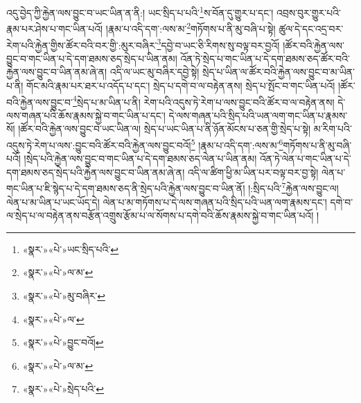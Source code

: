 འདུ་བྱེད་ཀྱི་རྐྱེན་ལས་བྱུང་བ་ཡང་ཡིན་ན་ནི:། ཡང་སྲིད་པ་པའི་\footnote{«སྣར་»«པེ་»ཡང་སྲིད་པའི་}ས་བོན་དུ་གྱུར་པ་དང་། འབྲས་བུར་གྱུར་པའི་རྣམ་པར་ཤེས་པ་གང་ཡིན་པའོ། །རྣམ་པ་འདི་དག་:ལས་མ་\footnote{«སྣར་»«པེ་»ལ་མ་}གཏོགས་པ་ནི་མུ་བཞི་པ་སྟེ། ཚུལ་དེ་དང་འདྲ་བར་རེག་པའི་རྐྱེན་གྱིས་ཚོར་བའི་བར་གྱི་:མུར་བཞིར་\footnote{«སྣར་»«པེ་»མུ་བཞིར་}དབྱེ་བ་ཡང་ཅི་རིགས་སུ་བལྟ་བར་བྱའོ། །ཚོར་བའི་རྐྱེན་ལས་བྱུང་བ་གང་ཡིན་པ་དེ་དག་ཐམས་ཅད་སྲེད་པ་ཡིན་ནམ། འོན་ཏེ་སྲེད་པ་གང་ཡིན་པ་དེ་དག་ཐམས་ཅད་ཚོར་བའི་རྐྱེན་ལས་བྱུང་བ་ཡིན་ནམ་ཞེ་ན། འདི་ལ་ཡང་མུ་བཞིར་དབྱེ་སྟེ། སྲེད་པ་ཡིན་ལ་ཚོར་བའི་རྐྱེན་ལས་བྱུང་བ་མ་ཡིན་པ་ནི། གོང་མའི་རྣམ་པར་ཐར་པ་འདོད་པ་དང་། སྲེད་པ་དགེ་བ་ལ་བརྟེན་ནས། སྲེད་པ་སྤོང་བ་གང་ཡིན་པའོ། །ཚོར་བའི་རྐྱེན་ལས་བྱུང་བ་\footnote{«སྣར་»«པེ་»ལ་}སྲེད་པ་མ་ཡིན་པ་ནི། རེག་པའི་འདུས་ཏེ་རེག་པ་ལས་བྱུང་བའི་ཚོར་བ་ལ་བརྟེན་ནས། དེ་ལས་གཞན་པའི་ཆོས་རྣམས་སྐྱེ་བ་གང་ཡིན་པ་དང་། དེ་ལས་གཞན་པའི་སྲིད་པའི་ཡན་ལག་གང་ཡིན་པ་རྣམས་སོ། །ཚོར་བའི་རྐྱེན་ལས་བྱུང་བ་ཡང་ཡིན་ལ། སྲེད་པ་ཡང་ཡིན་པ་ནི་ཉོན་མོངས་པ་ཅན་གྱི་སྲེད་པ་སྟེ། མ་རིག་པའི་འདུས་ཏེ་རེག་པ་ལས་:བྱུང་བའི་ཚོར་བའི་རྐྱེན་ལས་བྱུང་བའོ།\footnote{«སྣར་»«པེ་»བྱུང་བའོ།} །རྣམ་པ་འདི་དག་:ལས་མ་\footnote{«སྣར་»«པེ་»ལ་མ་}གཏོགས་པ་ནི་མུ་བཞི་པའོ། །སྲེད་པའི་རྐྱེན་ལས་བྱུང་བ་གང་ཡིན་པ་དེ་དག་ཐམས་ཅད་ལེན་པ་ཡིན་ནམ། འོན་ཏེ་ལེན་པ་གང་ཡིན་པ་དེ་དག་ཐམས་ཅད་སྲེད་པའི་རྐྱེན་ལས་བྱུང་བ་ཡིན་ནམ་ཞེ་ན། འདི་ལ་ཚིག་ཕྱི་མ་ཡིན་པར་བལྟ་བར་བྱ་སྟེ། ལེན་པ་གང་ཡིན་པ་ཇི་སྙེད་པ་དེ་དག་ཐམས་ཅད་ནི་སྲེད་པའི་རྐྱེན་ལས་བྱུང་བ་ཡིན་ནོ། །:སྲིད་པའི་\footnote{«སྣར་»«པེ་»སྲེད་པའི་}རྐྱེན་ལས་བྱུང་ལ། ལེན་པ་མ་ཡིན་པ་ཡང་ཡོད་དེ། ལེན་པ་མ་གཏོགས་པ་དེ་ལས་གཞན་པའི་སྲིད་པའི་ཡན་ལག་རྣམས་དང་། དགེ་བ་ལ་སྲེད་པ་ལ་བརྟེན་ནས་བརྩོན་འགྲུས་རྩོམ་པ་ལ་སོགས་པ་དགེ་བའི་ཆོས་རྣམས་སྐྱེ་བ་གང་ཡིན་པའོ། །
